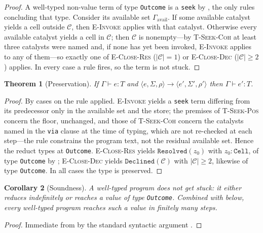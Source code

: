\documentclass[11pt,a4paper]{article}
\theoremstyle{thmstyle}
\newtheorem{theorem}{Theorem}[section]
\newtheorem{corollary}[theorem]{Corollary}
\theoremstyle{definition}
\theoremstyle{remark}
\newcommand{\Env}{\Gamma}
\newcommand{\store}{\Sigma}
\newcommand{\steps}{\longrightarrow}
\newcommand{\abs}[1]{\lvert#1\rvert}
\begin{document}
\begin{proof}
A well-typed non-value term of type \texttt{Outcome} is a \texttt{seek} by
, the only rules concluding that
type. Consider its available set $\Gamma_{\mathrm{avail}}$. If some
available catalyst yields a cell outside $\mathcal{C}$, then
\textsc{E-Invoke} applies with that catalyst. Otherwise every available
catalyst yields a cell in $\mathcal{C}$; then $\mathcal{C}$ is nonempty---by
\textsc{T-Seek-Coh} at least three catalysts were named and, if none has yet
been invoked, \textsc{E-Invoke} applies to any of them---so exactly one of
\textsc{E-Close-Res} ($\abs{\mathcal{C}}=1$) or \textsc{E-Close-Dec}
($\abs{\mathcal{C}}\ge2$) applies. In every case a rule fires, so the term
is not stuck.
\end{proof}

\begin{theorem}[Preservation]
\label{thm:preservation}
If $\Env\vdash e:T$ and
$\langle e,\store,\rho\rangle\steps\langle e',\store',\rho'\rangle$ then
$\Env\vdash e':T$.
\end{theorem}

\begin{proof}
By cases on the rule applied. \textsc{E-Invoke} yields a \texttt{seek} term
differing from its predecessor only in the available set and the store; the
premises of \textsc{T-Seek-Pos} concern the floor, unchanged, and those of
\textsc{T-Seek-Coh} concern the catalysts named in the \texttt{via} clause
at the time of typing, which are not re-checked at each step---the rule
constrains the program text, not the residual available set. Hence the
reduct types at \texttt{Outcome}. \textsc{E-Close-Res} yields
$\texttt{Resolved}(z_0)$ with $z_0:\texttt{Cell}$, of type \texttt{Outcome}
by ; \textsc{E-Close-Dec} yields
$\texttt{Declined}(\mathcal{C})$ with $\abs{\mathcal{C}}\ge2$, likewise of
type \texttt{Outcome}. In all cases the type is preserved.
\end{proof}

\begin{corollary}[Soundness]
\label{cor:soundness}
A well-typed program does not get stuck: it either reduces indefinitely or
reaches a value of type \texttt{Outcome}. Combined with
 below, every well-typed program reaches such a value
in finitely many steps.
\end{corollary}

\begin{proof}
Immediate from  by the standard
syntactic argument \citep{wright1994}.
\end{proof}
\end{document}
